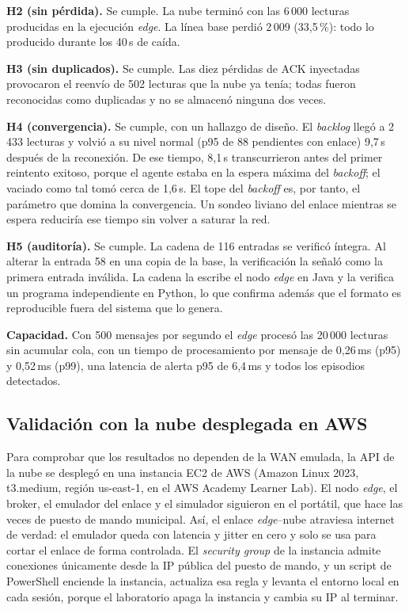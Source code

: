 \textbf{H2 (sin pérdida).} Se cumple. La nube terminó con las 6\,000 lecturas
producidas en la ejecución \emph{edge}. La línea base perdió 2\,009 (33,5\,\%):
todo lo producido durante los 40\,s de caída.

\textbf{H3 (sin duplicados).} Se cumple. Las diez pérdidas de ACK inyectadas
provocaron el reenvío de 502 lecturas que la nube ya tenía; todas fueron
reconocidas como duplicadas y no se almacenó ninguna dos veces.

\textbf{H4 (convergencia).} Se cumple, con un hallazgo de diseño. El
\emph{backlog} llegó a 2\,433 lecturas y volvió a su nivel normal (p95 de 88
pendientes con enlace) 9,7\,s después de la reconexión. De ese tiempo, 8,1\,s
transcurrieron antes del primer reintento exitoso, porque el agente estaba en
la espera máxima del \emph{backoff}; el vaciado como tal tomó cerca de 1,6\,s.
El tope del \emph{backoff} es, por tanto, el parámetro que domina la
convergencia. Un sondeo liviano del enlace mientras se espera reduciría ese
tiempo sin volver a saturar la red.

\textbf{H5 (auditoría).} Se cumple. La cadena de 116 entradas se verificó
íntegra. Al alterar la entrada 58 en una copia de la base, la verificación la
señaló como la primera entrada inválida. La cadena la escribe el nodo
\emph{edge} en Java y la verifica un programa independiente en Python, lo que
confirma además que el formato es reproducible fuera del sistema que lo genera.

\textbf{Capacidad.} Con 500 mensajes por segundo el \emph{edge} procesó las
20\,000 lecturas sin acumular cola, con un tiempo de procesamiento por mensaje
de 0,26\,ms (p95) y 0,52\,ms (p99), una latencia de alerta p95 de 6,4\,ms y
todos los episodios detectados.

\subsection{Validación con la nube desplegada en AWS}
\label{sec:prototipo-aws}

Para comprobar que los resultados no dependen de la WAN emulada, la API de la
nube se desplegó en una instancia EC2 de AWS (Amazon Linux 2023, t3.medium,
región us-east-1, en el AWS Academy Learner Lab). El nodo \emph{edge}, el
broker, el emulador del enlace y el simulador siguieron en el portátil, que
hace las veces de puesto de mando municipal. Así, el enlace \emph{edge}--nube
atraviesa internet de verdad: el emulador queda con latencia y jitter en cero y
solo se usa para cortar el enlace de forma controlada. El \emph{security group}
de la instancia admite conexiones únicamente desde la IP pública del puesto de
mando, y un script de PowerShell enciende la instancia, actualiza esa regla y
levanta el entorno local en cada sesión, porque el laboratorio apaga la
instancia y cambia su IP al terminar.


